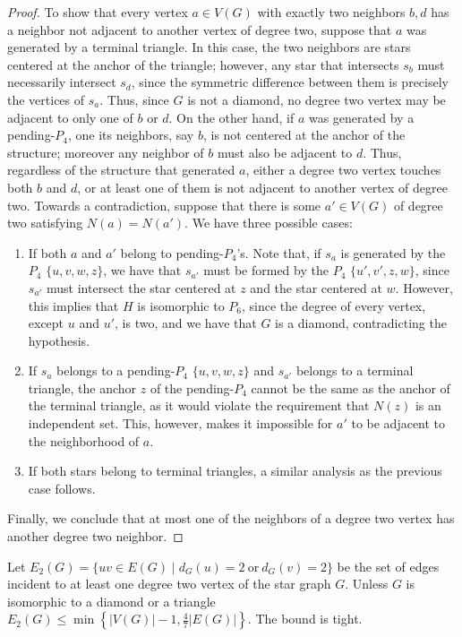 \begin{proof}
   To show that every vertex $a \in V(G)$ with exactly two neighbors $b,d$ has a neighbor not adjacent to another vertex of degree two, suppose that $a$ was generated by a terminal triangle.
   In this case, the two neighbors are stars centered at the anchor of the triangle; however, any star that intersects $s_b$ must necessarily intersect $s_d$, since the symmetric difference between them is precisely the vertices of $s_a$.
   Thus, since $G$ is not a diamond, no degree two vertex may be adjacent to only one of $b$ or $d$.
   On the other hand, if $a$ was generated by a pending-$P_4$, one its neighbors, say $b$, is not centered at the anchor of the structure; moreover any neighbor of $b$ must also be adjacent to $d$.
   Thus, regardless of the structure that generated $a$, either a degree two vertex touches both $b$ and $d$, or at least one of them is not adjacent to another vertex of degree two.
   Towards a contradiction, suppose that there is some $a' \in V(G)$ of degree two satisfying $N(a) = N(a')$.
   We have three possible cases:
   \begin{enumerate}\addtocounter{enumi}{5}
       \item If both $a$ and $a'$ belong to pending-$P_4$'s. Note that, if $s_a$ is generated by the $P_4$ $\{u,v,w,z\}$, we have that $s_{a'}$ must be formed by the $P_4$ $\{u',v', z, w\}$, since $s_{a'}$ must intersect the star centered at $z$ and the star centered at $w$.
       However, this implies that $H$ is isomorphic to $P_6$, since the degree of every vertex, except $u$ and $u'$, is two, and we have that $G$ is a diamond, contradicting the hypothesis.
       \item If $s_a$ belongs to a pending-$P_4$ $\{u,v,w,z\}$ and $s_{a'}$ belongs to a terminal triangle, the anchor $z$ of the pending-$P_4$ cannot be the same as the anchor of the terminal triangle, as it would violate the requirement that $N(z)$ is an independent set.
       This, however, makes it impossible for $a'$ to be adjacent to the neighborhood of $a$.
       \item If both stars belong to terminal triangles, a similar analysis as the previous case follows.
   \end{enumerate}
   Finally, we conclude that at most one of the neighbors of a degree two vertex has another degree two neighbor.
\end{proof}

\begin{lemma}
    Let $E_2(G) = \{uv \in E(G) \mid d_G(u) = 2\ \text{or}\ d_G(v) = 2\}$ be the set of edges incident to at least one degree two vertex of the star graph $G$. Unless $G$ is isomorphic to a diamond or a triangle $E_2(G) \leq \min\left\{|V(G)| - 1, \frac{4}{7}|E(G)|\right\}$.
    The bound is tight.
\end{lemma}


